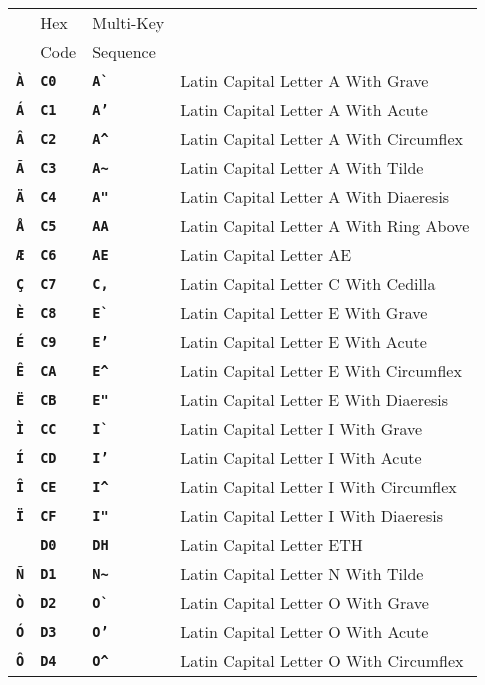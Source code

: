 \documentclass[12pt]{article}
\newcommand{\TT}[1]{{\tt \bfseries #1}}
\newlength{\figurewidth}
\newenvironment{boxedfigure}[1][!btp]%
	{\begin{figure*}[#1]
	 \begin{lrbox}{\figurebox}
	 \begin{minipage}{\figurewidth}

	 \vspace*{1ex}}%
	{
	 \vspace*{1ex}

	 \end{minipage}
	 \end{lrbox}

	 \centering
	 \fbox{\hspace*{0.1in}\usebox{\figurebox}\hspace*{0.1in}}
	 \end{figure*}}
\begin{document}
\begin{boxedfigure}[p]
\begin{tabular}{llll}
& Hex & Multi-Key \\
& Code & Sequence
\\[1ex]
\TT{\`A}
  & \TT{C0} & \TT{A\`~} & Latin Capital Letter A With Grave \\
\TT{\'A}
  & \TT{C1} & \TT{A'} & Latin Capital Letter A With Acute \\
\TT{\^A}
  & \TT{C2} & \TT{A\textasciicircum} & Latin Capital Letter A With Circumflex \\
\TT{\~A}
  & \TT{C3} & \TT{A\textasciitilde} & Latin Capital Letter A With Tilde \\
\TT{\"A}
  & \TT{C4} & \TT{A"} & Latin Capital Letter A With Diaeresis \\
\TT{\AA}
  & \TT{C5} & \TT{AA} & Latin Capital Letter A With Ring Above \\
\TT{\AE}
  & \TT{C6} & \TT{AE} & Latin Capital Letter AE \\
\TT{\c{C}}
  & \TT{C7} & \TT{C,} & Latin Capital Letter C With Cedilla \\
\TT{\`E}
  & \TT{C8} & \TT{E\`~} & Latin Capital Letter E With Grave \\
\TT{\'E}
  & \TT{C9} & \TT{E'} & Latin Capital Letter E With Acute \\
\TT{\^E}
  & \TT{CA} & \TT{E\textasciicircum} & Latin Capital Letter E With Circumflex \\
\TT{\"E}
  & \TT{CB} & \TT{E"} & Latin Capital Letter E With Diaeresis \\
\TT{\`I}
  & \TT{CC} & \TT{I\`~} & Latin Capital Letter I With Grave \\
\TT{\'I}
  & \TT{CD} & \TT{I'} & Latin Capital Letter I With Acute \\
\TT{\^I}
  & \TT{CE} & \TT{I\textasciicircum} & Latin Capital Letter I With Circumflex \\
\TT{\"I}
  & \TT{CF} & \TT{I"} & Latin Capital Letter I With Diaeresis \\
\TT{\DH}
  & \TT{D0} & \TT{DH} & Latin Capital Letter ETH \\
\TT{\~N}
  & \TT{D1} & \TT{N\textasciitilde} & Latin Capital Letter N With Tilde \\
\TT{\`O}
  & \TT{D2} & \TT{O\`~} & Latin Capital Letter O With Grave \\
\TT{\'O}
  & \TT{D3} & \TT{O'} & Latin Capital Letter O With Acute \\
\TT{\^O}
  & \TT{D4} & \TT{O\textasciicircum} & Latin Capital Letter O With Circumflex \\

\end{tabular}
\end{boxedfigure}
\end{document}
